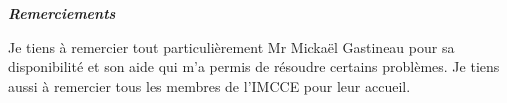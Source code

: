 
\vspace*{\fill}

\begin{flushright}

{\LARGE\par{\textbf{\emph{Remerciements}}}}

Je tiens à remercier tout particulièrement Mr Mickaël Gastineau pour sa disponibilité et son aide qui m'a permis de résoudre certains problèmes. Je tiens aussi à 
remercier tous les membres de l'IMCCE pour leur accueil.

\end{flushright}

\vspace{\fill}